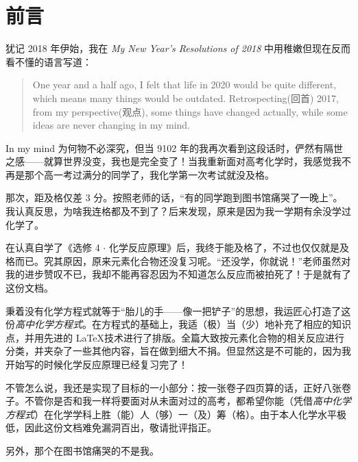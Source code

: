 \documentclass[UTF8, b5paper, 10pt]{article}
\author{Orange}
\date{\today}
\title{\insertsubject}
\newcommand \insertsubject {{高中化学方程式}}
\begin{document}
	\thispagestyle{empty}

	\section*{前言}

	犹记 2018 年伊始，我在 \emph{My New Year's Resolutions of 2018} 中用稚嫩但现在反而看不懂的语言写道：
	\begin{quotation}
		One year and a half ago, I felt that life in 2020 would be quite different, which means many things would be outdated. Retrospecting(回首) 2017, from my perspective(观点), some things have changed actually, while some ideas are never changing in my mind.
	\end{quotation}

	In my mind 为何物不必深究，但当 9102 年的我再次看到这段话时，俨然有隔世之感——就算世界没变，我也是完全变了！当我重新面对高考化学时，我感觉我不再是那个高一考过满分的同学了，我化学第一次考试就没及格。

	那次，距及格仅差 3 分。按照老师的话，``有的同学跑到图书馆痛哭了一晚上''。我认真反思，为啥我连格都及不到了？后来发现，原来是因为我一学期有余没学过化学了。

	在认真自学了《选修 4 $\cdot$ 化学反应原理》后，我终于能及格了，不过也仅仅就是及格而已。究其原因，原来元素化合物还没复习呢。``还没学，你就说！''老师虽然对我的进步赞叹不已，我却不能再容忍因为不知道怎么反应而被拍死了！于是就有了这份文档。

	\bigskip

	秉着没有化学方程式就等于``胎儿的手——像一把铲子''的思想，我运匠心打造了这份\emph{\insertsubject}。在方程式的基础上，我适（极）当（少）地补充了相应的知识点，并用先进的 \LaTeX 技术进行了排版。全篇大致按元素化合物的相关反应进行分类，并夹杂了一些其他内容，旨在做到细大不捐。但显然这是不可能的，因为我开始写的时候化学反应原理已经复习完了！

	不管怎么说，我还是实现了目标的一小部分：按一张卷子四页算的话，正好八张卷子。不管你是否和我一样将要面对从未面对过的高考，都希望你能（凭借\emph{\insertsubject}）在化学学科上胜（能）人（够）一（及）筹（格）。由于本人化学水平极低，因此这份文档难免漏洞百出，敬请批评指正。

	另外，那个在图书馆痛哭的不是我。

	\bigskip



	\let\thefootnote\relax{}
\end{document}
